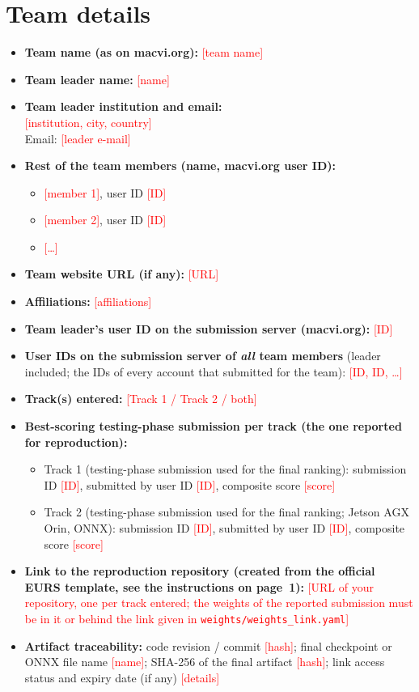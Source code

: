 \documentclass{article}
\newcommand{\todo}[1]{\textcolor{red}{[#1]}}
\begin{document}
\section{Team details}\label{sec:team}
\begin{itemize}
\item \textbf{Team name (as on macvi.org):} \todo{team name}
\item \textbf{Team leader name:} \todo{name}
\item \textbf{Team leader institution and email:} \\ \todo{institution, city, country} \\ Email: \todo{leader e-mail}
\item \textbf{Rest of the team members (name, macvi.org user ID):}
  \begin{itemize}
    \item \todo{member 1}, user ID \todo{ID}
    \item \todo{member 2}, user ID \todo{ID}
    \item \todo{\dots}
  \end{itemize}
\item \textbf{Team website URL (if any):} \todo{URL}
\item \textbf{Affiliations:} \todo{affiliations}
\item \textbf{Team leader's user ID on the submission server (macvi.org):} \todo{ID}
\item \textbf{User IDs on the submission server of \emph{all} team members} (leader included; the IDs of every account that submitted for the team): \todo{ID, ID, \dots}
\item \textbf{Track(s) entered:} \todo{Track 1 / Track 2 / both}
\item \textbf{Best-scoring testing-phase submission per track (the one reported for reproduction):}
  \begin{itemize}
    \item Track 1 (testing-phase submission used for the final ranking): submission ID \todo{ID}, submitted by user ID \todo{ID}, composite score \todo{score}
    \item Track 2 (testing-phase submission used for the final ranking; Jetson AGX Orin, ONNX): submission ID \todo{ID}, submitted by user ID \todo{ID}, composite score \todo{score}
  \end{itemize}
\item \textbf{Link to the reproduction repository (created from the official EURS template, see the instructions on page~1):} \todo{URL of your repository, one per track entered; the weights of the reported submission must be in it or behind the link given in \texttt{weights/weights\_link.yaml}}
\item \textbf{Artifact traceability:} code revision / commit \todo{hash}; final checkpoint or ONNX file name \todo{name}; SHA-256 of the final artifact \todo{hash}; link access status and expiry date (if any) \todo{details}
\end{itemize}
\end{document}

